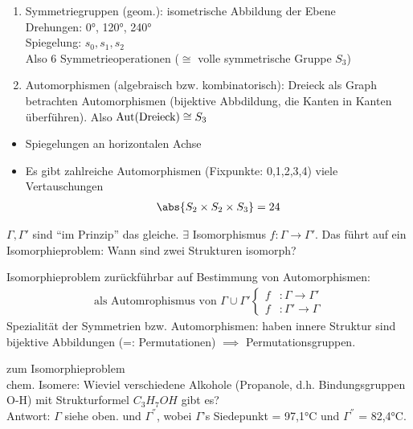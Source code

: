 \begin{example}
	\begin{enumerate}
		\item Symmetriegruppen (geom.):	isometrische Abbildung der Ebene\\
		Drehungen: 0°, 120°, 240°\\
		Spiegelung: $s_0,s_1,s_2$\\
		Also 6 Symmetrieoperationen ($\cong$ volle symmetrische Gruppe $S_3$)
		\item Automorphismen (algebraisch bzw. kombinatorisch): Dreieck als Graph betrachten Automorphismen (bijektive Abbdildung, die Kanten in Kanten überführen). Also $\operatorname{Aut}(\text{Dreieck}) \cong S_3$
	\end{enumerate}
	\begin{itemize}
		\item Spiegelungen an horizontalen Achse
		\item Es gibt zahlreiche Automorphismen (Fixpunkte: 0,1,2,3,4) viele Vertauschungen
		\begin{align*}
			\abs{S_2 \times S_2 \times S_3} = 24
		\end{align*}
	\end{itemize}
	$\Gamma,\Gamma'$ sind ``im Prinzip'' das gleiche. $\exists$ Isomorphismus $f\colon \Gamma \to \Gamma'$. Das führt auf ein Isomorphieproblem: Wann sind zwei Strukturen isomorph?
\end{example}
\begin{remark}
	Isomorphieproblem zurückführbar auf Bestimmung von Automorphismen:
	\begin{align*}
		\text{als Automrophismus von $\Gamma \cup \Gamma'$}\begin{cases}
			f&\colon \Gamma \to \Gamma'\\
			f&\colon \Gamma' \to \Gamma 
		\end{cases}
	\end{align*}
	Spezialität der Symmetrien bzw. Automorphismen: haben innere Struktur sind bijektive Abbildungen (=: Permutationen) $\implies$ Permutationsgruppen.
\end{remark}
\begin{example}
	zum Isomorphieproblem\\
	chem. Isomere: Wieviel verschiedene Alkohole (Propanole, d.h. Bindungsgruppen O-H) mit Strukturformel $C_3 H_7 OH$ gibt es?\\
	Antwort: $\Gamma$ siehe oben. und
	$\Gamma^{''}$, wobei $\Gamma$'s Siedepunkt = 97,1°C und $\Gamma^{''}$ = 82,4°C.
\end{example}
